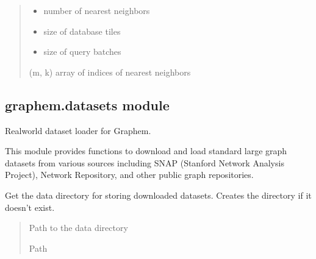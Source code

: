 \documentclass[letterpaper,10pt,english]{sphinxmanual}
\begin{document}
\begin{fulllineitems}
\begin{fulllineitems}
\begin{quote}
\begin{description}
\begin{itemize}
\item {} 
\sphinxAtStartPar
{} \textendash{} number of nearest neighbors

\item {} 
\sphinxAtStartPar
{} \textendash{} size of database tiles

\item {} 
\sphinxAtStartPar
{} \textendash{} size of query batches

\end{itemize}

\sphinxAtStartPar
(m, k) array of indices of nearest neighbors

\end{description}\end{quote}

\end{fulllineitems}


\end{fulllineitems}



\subsection{graphem.datasets module}
\label{\detokenize{api_reference:module-2}}\label{\detokenize{api_reference:graphem-datasets-module}}
\sphinxAtStartPar
Real\sphinxhyphen{}world dataset loader for Graphem.

\sphinxAtStartPar
This module provides functions to download and load standard large graph datasets
from various sources including SNAP (Stanford Network Analysis Project),
Network Repository, and other public graph repositories.

\begin{fulllineitems}
\label{\detokenize{api_reference:id39}}
\pysigstartsignatures
{}
\pysigstopsignatures
\sphinxAtStartPar
Get the data directory for storing downloaded datasets.
Creates the directory if it doesn’t exist.
\begin{quote}\begin{description}
\sphinxAtStartPar
Path to the data directory

\sphinxAtStartPar
Path

\end{description}\end{quote}

\end{fulllineitems}
\end{document}

